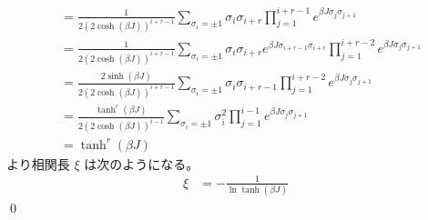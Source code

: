 \documentclass[uplatex,dvipdfmx,a4paper,11pt]{jlreq}
\makeatletter
\numberwithin{equation}{section}
\theoremstyle{definition}
\renewenvironment{proof}[1][\proofname]{\par
  \normalfont
  \topsep6\p@\@plus6\p@ \trivlist
  \item[\hskip\labelsep{\bfseries #1}\@addpunct{\bfseries}]\ignorespaces\quad\par
}{%
  \qed\endtrivlist\@endpefalse
}
\renewcommand\proofname{証明}
\makeatother
\begin{document}
\begin{proof}
\begin{align}
                                       & = \frac{1}{2(2\cosh(\beta J))^{i+r-1}}\sum_{\sigma_i = \pm 1}\sigma_i\sigma_{i + r}\prod_{j=1}^{i+r-1}e^{\beta J\sigma_j\sigma_{j+1}}                                      \\
                                       & = \frac{1}{2(2\cosh(\beta J))^{i+r-1}}\sum_{\sigma_i = \pm 1}\sigma_i\sigma_{i + r}e^{\beta J\sigma_{i+r-1}\sigma_{i+r}}\prod_{j=1}^{i+r-2}e^{\beta J\sigma_j\sigma_{j+1}} \\
                                       & = \frac{2\sinh(\beta J)}{2(2\cosh(\beta J))^{i+r-1}}\sum_{\sigma_i = \pm 1}\sigma_i\sigma_{i + r - 1}\prod_{j=1}^{i+r-2}e^{\beta J\sigma_j\sigma_{j+1}}                    \\
                                       & = \frac{\tanh^r(\beta J)}{2(2\cosh(\beta J))^{i-1}}\sum_{\sigma_i = \pm 1}\sigma_i^2\prod_{j=1}^{i-1}e^{\beta J\sigma_j\sigma_{j+1}}                                       \\
                                       & = \tanh^r(\beta J)
  \end{align}
  より相関長 $\xi$ は次のようになる。
  \begin{align}
    \xi & = -\frac{1}{\ln\tanh(\beta J)}
  \end{align}
\end{proof}

\setcounter{subsection}{6}
\end{document}
